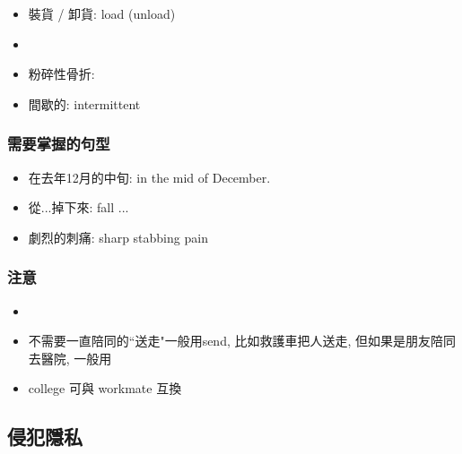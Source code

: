 \begin{multicols}{2}
\begin{itemize}
\begin{center}
  \end{center}
  \item 裝貨 / 卸貨: load (unload)
  \item {}
  \item 粉碎性骨折: 
  \item 間歇的: intermittent
\end{itemize}
\end{multicols}

\subsubsection*{需要掌握的句型}
\begin{itemize}
  \itemsep0em
  \item 在去年12月的中旬: in the mid of  December.
  \item 從...掉下來: fall ...
  \item 劇烈的刺痛: sharp stabbing pain
\end{itemize}

\subsubsection*{注意}
\begin{itemize}
  \itemsep0em
  \item {}
  \item 不需要一直陪同的``送走"一般用send, 比如救護車把人送走, 但如果是朋友陪同去醫院, 一般用
  \item college 可與 workmate 互換
\end{itemize}

\subsection{侵犯隱私}
